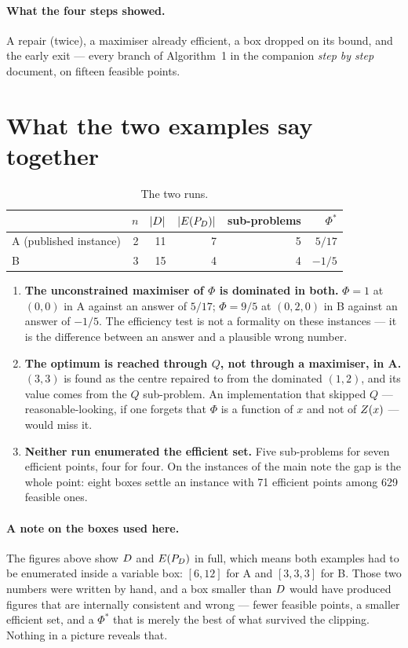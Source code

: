 \documentclass[11pt,a4paper]{article}
\begin{document}
\paragraph{What the four steps showed.}  A repair (twice), a maximiser already
efficient, a box dropped on its bound, and the early exit --- every branch of
Algorithm~1 in the companion \emph{step by step} document, on fifteen feasible
points.

\section{What the two examples say together}

\begin{table}[h]
\centering
\caption{The two runs.}
\begin{tabular}{lrrrrr}
\toprule
 & $n$ & $|D|$ & $|E(P_{D})|$ & sub-problems & $\Phi^{*}$ \\
\midrule
A (published instance) & 2 & 11 & 7 & 5 & $5/17$ \\
B & 3 & 15 & 4 & 4 & $-1/5$ \\
\bottomrule
\end{tabular}
\end{table}

\begin{enumerate}
\item \textbf{The unconstrained maximiser of $\Phi$ is dominated in both.}
  $\Phi = 1$ at $(0,0)$ in A against an answer of $5/17$; $\Phi = 9/5$ at
  $(0,2,0)$ in B against an answer of $-1/5$.  The efficiency test is not a
  formality on these instances --- it is the difference between an answer and a
  plausible wrong number.
\item \textbf{The optimum is reached through $Q$, not through a maximiser, in
  A.}  $(3,3)$ is found as the centre repaired to from the dominated $(1,2)$,
  and its value comes from the $Q$ sub-problem.  An implementation that skipped
  $Q$ --- reasonable-looking, if one forgets that $\Phi$ is a function of $x$ and
  not of $Z(x)$ --- would miss it.
\item \textbf{Neither run enumerated the efficient set.}  Five sub-problems for
  seven efficient points, four for four.  On the instances of the main note the
  gap is the whole point: eight boxes settle an instance with 71 efficient
  points among 629 feasible ones.
\end{enumerate}

\paragraph{A note on the boxes used here.}
The figures above show $D$ and $E(P_{D})$ in full, which means both examples had
to be enumerated inside a variable box: $[6,12]$ for A and $[3,3,3]$ for B.
Those two numbers were written by hand, and a box smaller than $D$ would
have produced figures that are internally consistent and wrong --- fewer
feasible points, a smaller efficient set, and a $\Phi^{*}$ that is merely the
best of what survived the clipping. Nothing in a picture reveals that.
\end{document}
